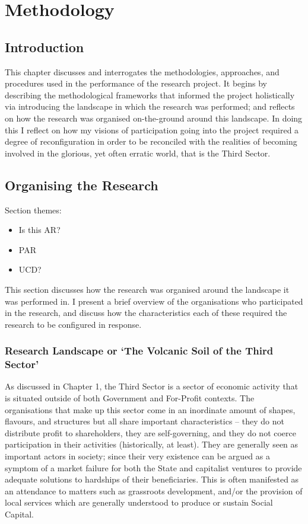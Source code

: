 \chapter{Methodology}
\label{sec:method}

\section{Introduction}
This chapter discusses and interrogates the methodologies, approaches, and procedures used in the performance of the research project. It begins by describing the methodological frameworks that informed the project holistically via introducing the landscape in which the research was performed; and reflects on how the research was organised on-the-ground around this landscape. In doing this I reflect on how my visions of participation going into the project required a degree of reconfiguration in order to be reconciled with the realities of becoming involved in the glorious, yet often erratic world, that is the Third Sector.

\section{Organising the Research}
\label{sec:method:approach}

%
Section themes:
\begin{itemize}
\item Is this AR?
\item PAR
\item UCD?
\end{itemize}

This section discusses how the research was organised around the landscape it was performed in. I present a brief overview of the organisations who participated in the research, and discuss how the characteristics each of these required the research to be configured in response.

\subsection{Research Landscape or `The Volcanic Soil of the Third Sector'}

As discussed in Chapter 1, the Third Sector is a sector of economic activity that is situated outside of both Government and For-Profit contexts. The organisations that make up this sector come in an inordinate amount of shapes, flavours, and structures but all share important characteristics -- they do not distribute profit to shareholders, they are self-governing, and they do not coerce participation in their activities (historically, at least). They are generally seen as important actors in society; since their very existence can be argued as a symptom of a market failure for both the State and capitalist ventures to provide adequate solutions to hardships of their beneficiaries. This is often manifested as an attendance to matters such as grassroots development, and/or the provision of local services which are generally understood to produce or sustain Social Capital.


